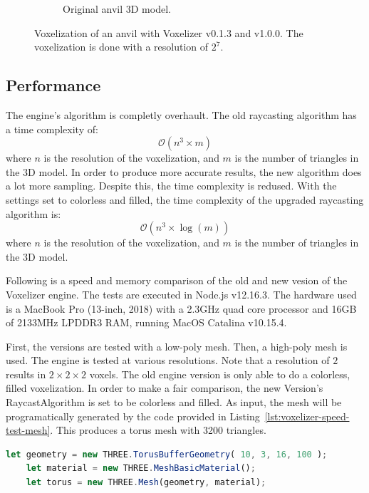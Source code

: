 \begin{figure}[hp!]
\begin{subfigure}[b]{0.7\textwidth}
        \caption{Original anvil 3D model.}
        \label{fig:result-original-anvil}
    \end{subfigure}
    \hfill
    \caption{Voxelization of an anvil with Voxelizer v0.1.3 and v1.0.0. The voxelization is done with a resolution of $2^7$.}
    \label{fig:result-voxelizer-comparison-anvil}
\end{figure}
\clearpage
\subsection{Performance}
\label{sec:result-voxelizer-performance}
The engine's algorithm is completly overhault. The old raycasting algorithm has a time complexity of:
\[ \mathcal{O}(n^3\times m) \]
where $n$ is the resolution of the voxelization, and $m$ is the number of triangles in the 3D model. In order to produce more accurate results, the new algorithm does a lot more sampling. Despite this, the time complexity is redused. With the settings set to colorless and filled, the time complexity of the upgraded raycasting algorithm is:
\[ \mathcal{O}(n^3\times \log(m)) \]
where $n$ is the resolution of the voxelization, and $m$ is the number of triangles in the 3D model.

Following is a speed and memory comparison of the old and new vesion of the Voxelizer engine. The tests are executed in Node.js v12.16.3. The hardware used is a MacBook Pro (13-inch, 2018) with a 2.3GHz quad core processor and 16GB of 2133MHz LPDDR3 RAM, running MacOS Catalina v10.15.4.

First, the versions are tested with a low-poly mesh. Then, a high-poly mesh is used. The engine is tested at various resolutions. Note that a resolution of $2$ results in $2\times2\times2$ voxels. The old engine version is only able to do a colorless, filled voxelization. In order to make a fair comparison, the new Version's RaycastAlgorithm is set to be colorless and filled. As input, the mesh will be programatically generated by the code provided in Listing~\ref{lst:voxelizer-speed-test-mesh}. This produces a torus mesh with 3200 triangles.
\begin{lstlisting}[language=JavaScript,caption={JS code for generating low-detailed torus mesh.},label={lst:voxelizer-speed-test-mesh}]
    let geometry = new THREE.TorusBufferGeometry( 10, 3, 16, 100 );
    let material = new THREE.MeshBasicMaterial();
    let torus = new THREE.Mesh(geometry, material);
\end{lstlisting}

